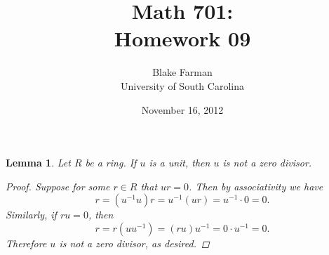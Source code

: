 \documentclass[10pt]{amsart}
\author{Blake Farman\\University of South Carolina}
\title{Math 701:\\Homework 09}
\date{November 16, 2012}
\begin{document}
\maketitle

\newtheorem{thm}{}
\newtheorem{lem}{Lemma}

\begin{lem}\label{units}
  Let $R$ be a ring.  If $u$ is a unit, then $u$ is not a zero divisor.
  \begin{proof}
    Suppose for some $r \in R$ that $ur = 0$.
    Then by associativity we have 
    $$r = (u^{-1}u)r = u^{-1}(ur) = u^{-1}\cdot 0 = 0.$$
    Similarly, if $ru = 0$, then
    $$r = r(uu^{-1}) = (ru)u^{-1} = 0 \cdot u^{-1} = 0.$$
    Therefore $u$ is not a zero divisor, as desired.
  \end{proof}
\end{lem}
\end{document}
